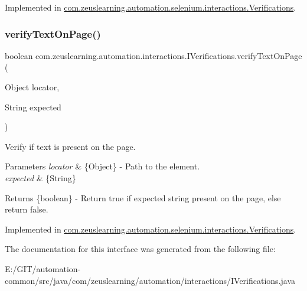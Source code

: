 Implemented in \hyperlink{classcom_1_1zeuslearning_1_1automation_1_1selenium_1_1interactions_1_1Verifications_a6fbe5c6cd7a92208444c669cca7cb502}{com.\+zeuslearning.\+automation.\+selenium.\+interactions.\+Verifications}.

\hypertarget{interfacecom_1_1zeuslearning_1_1automation_1_1interactions_1_1IVerifications_a2947831d2ac8783dd93e5fec4c33ebdd}{}\label{interfacecom_1_1zeuslearning_1_1automation_1_1interactions_1_1IVerifications_a2947831d2ac8783dd93e5fec4c33ebdd} 
\subsubsection{\texorpdfstring{verify\+Text\+On\+Page()}{verifyTextOnPage()}}
{\footnotesize\ttfamily boolean com.\+zeuslearning.\+automation.\+interactions.\+I\+Verifications.\+verify\+Text\+On\+Page (\begin{DoxyParamCaption}\item[{Object}]{locator,  }\item[{String}]{expected }\end{DoxyParamCaption})}

Verify if text is present on the page.


\begin{DoxyParams}{Parameters}
{\em locator} & \{Object\} -\/ Path to the element. \\
\hline
{\em expected} & \{String\} \\
\hline
\end{DoxyParams}
\begin{DoxyReturn}{Returns}
\{boolean\} -\/ Return {\ttfamily true} if expected string present on the page, else return {\ttfamily false}. 
\end{DoxyReturn}


Implemented in \hyperlink{classcom_1_1zeuslearning_1_1automation_1_1selenium_1_1interactions_1_1Verifications_a041fe10631722deb8bd5f5f20760cd0c}{com.\+zeuslearning.\+automation.\+selenium.\+interactions.\+Verifications}.



The documentation for this interface was generated from the following file\+:\begin{DoxyCompactItemize}
\item 
E\+:/\+G\+I\+T/automation-\/common/src/java/com/zeuslearning/automation/interactions/I\+Verifications.\+java\end{DoxyCompactItemize}
